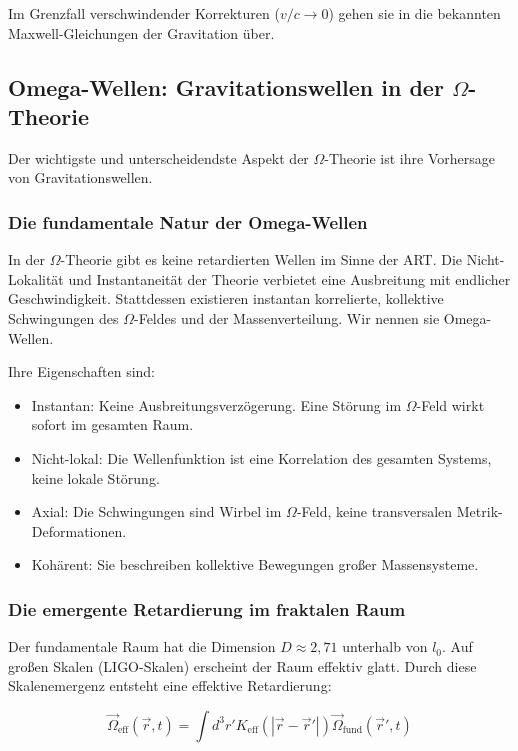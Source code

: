 \documentclass[12pt,a4paper]{article}
\begin{document}
Im Grenzfall verschwindender Korrekturen ($v/c \rightarrow 0$) gehen sie in die bekannten Maxwell-Gleichungen der Gravitation über.

\subsection{Omega-Wellen: Gravitationswellen in der $\Omega$-Theorie}

Der wichtigste und unterscheidendste Aspekt der $\Omega$-Theorie ist ihre Vorhersage von Gravitationswellen.

\subsubsection{Die fundamentale Natur der Omega-Wellen}

In der $\Omega$-Theorie gibt es keine retardierten Wellen im Sinne der ART. Die Nicht-Lokalität und Instantaneität der Theorie verbietet eine Ausbreitung mit endlicher Geschwindigkeit. Stattdessen existieren instantan korrelierte, kollektive Schwingungen des $\Omega$-Feldes und der Massenverteilung. Wir nennen sie Omega-Wellen.

Ihre Eigenschaften sind:
\begin{itemize}
\item Instantan: Keine Ausbreitungsverzögerung. Eine Störung im $\Omega$-Feld wirkt sofort im gesamten Raum.
\item Nicht-lokal: Die Wellenfunktion ist eine Korrelation des gesamten Systems, keine lokale Störung.
\item Axial: Die Schwingungen sind Wirbel im $\Omega$-Feld, keine transversalen Metrik-\\Deformationen.
\item Kohärent: Sie beschreiben kollektive Bewegungen großer Massensysteme.
\end{itemize}

\subsubsection{Die emergente Retardierung im fraktalen Raum}

Der fundamentale Raum hat die Dimension $D \approx 2,71$ unterhalb von $l_0$. Auf großen Skalen (LIGO-Skalen) erscheint der Raum effektiv glatt. Durch diese Skalenemergenz entsteht eine effektive Retardierung:

\begin{equation}
\vec{\Omega}_{\text{eff}}(\vec{r}, t) = \int d^3 r' K_{\text{eff}}(|\vec{r} - \vec{r}'|) \vec{\Omega}_{\text{fund}}(\vec{r}', t)
\end{equation}
\end{document}
